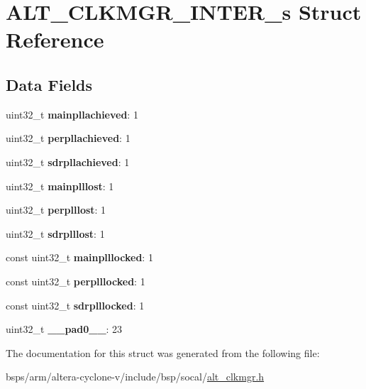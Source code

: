 \hypertarget{structALT__CLKMGR__INTER__s}{}\section{A\+L\+T\+\_\+\+C\+L\+K\+M\+G\+R\+\_\+\+I\+N\+T\+E\+R\+\_\+s Struct Reference}
\label{structALT__CLKMGR__INTER__s}
\subsection*{Data Fields}
\begin{DoxyCompactItemize}
\item 
\mbox{\label{structALT__CLKMGR__INTER__s_a60b27fdf1cbecc4fe65ccf9b6cf7b638}} 
uint32\+\_\+t {\bfseries mainpllachieved}\+: 1
\item 
\mbox{\label{structALT__CLKMGR__INTER__s_a1f4d5b6ebae91633447afce211e8882a}} 
uint32\+\_\+t {\bfseries perpllachieved}\+: 1
\item 
\mbox{\label{structALT__CLKMGR__INTER__s_a3098b2b6359ef4a8a088700055973077}} 
uint32\+\_\+t {\bfseries sdrpllachieved}\+: 1
\item 
\mbox{\label{structALT__CLKMGR__INTER__s_a3c8e9300d2e4a0105c09e2c7c2cd0293}} 
uint32\+\_\+t {\bfseries mainplllost}\+: 1
\item 
\mbox{\label{structALT__CLKMGR__INTER__s_ae6890258c0f4e62dcfa0c8e3acd119df}} 
uint32\+\_\+t {\bfseries perplllost}\+: 1
\item 
\mbox{\label{structALT__CLKMGR__INTER__s_a8025b7e05b1ef8b6863349e76472d36f}} 
uint32\+\_\+t {\bfseries sdrplllost}\+: 1
\item 
\mbox{\label{structALT__CLKMGR__INTER__s_abed7a1b97b5e883323d07322ce3b1a8d}} 
const uint32\+\_\+t {\bfseries mainplllocked}\+: 1
\item 
\mbox{\label{structALT__CLKMGR__INTER__s_a94f11bfd8f7093eac4fcf44d2c5646be}} 
const uint32\+\_\+t {\bfseries perplllocked}\+: 1
\item 
\mbox{\label{structALT__CLKMGR__INTER__s_a239f8f1d7d1608dd166fbcb49fd79b6e}} 
const uint32\+\_\+t {\bfseries sdrplllocked}\+: 1
\item 
\mbox{\label{structALT__CLKMGR__INTER__s_a1350f68bd62a5ec01f8713f9b47f7a89}} 
uint32\+\_\+t {\bfseries \+\_\+\+\_\+pad0\+\_\+\+\_\+}\+: 23
\end{DoxyCompactItemize}


The documentation for this struct was generated from the following file\+:\begin{DoxyCompactItemize}
\item 
bsps/arm/altera-\/cyclone-\/v/include/bsp/socal/\mbox{\hyperlink{alt__clkmgr_8h}{alt\+\_\+clkmgr.\+h}}\end{DoxyCompactItemize}
